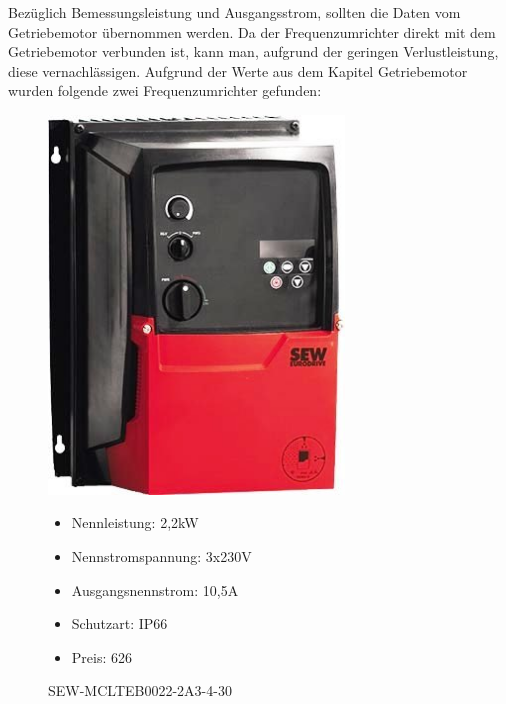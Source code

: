 Bezüglich Bemessungsleistung und Ausgangsstrom, sollten die Daten vom Getriebemotor übernommen werden. Da der Frequenzumrichter direkt mit dem Getriebemotor verbunden ist, kann man, aufgrund der geringen Verlustleistung, diese vernachlässigen. Aufgrund der Werte aus dem Kapitel Getriebemotor wurden folgende zwei Frequenzumrichter gefunden:

\begin{figure}
\begin{minipage}[t]{0.45\textwidth}
\includegraphics[width=0.70\textwidth]{SEWFU}
\caption{SEW-MCLTEB0022-2A3-4-30}

\begin{itemize}
	\item{Nennleistung: 2,2kW}
	\item{Nennstromspannung: 3x230V}
	\item{Ausgangsnennstrom: 10,5A}
	\item{Schutzart: IP66}
	\item{Preis: 626\textsf{\texteuro}}
\end{itemize}

\end{minipage}
\hspace{0.1\textwidth}
\begin{minipage}[t]{0.45\textwidth}


\end{minipage}
\end{figure}
